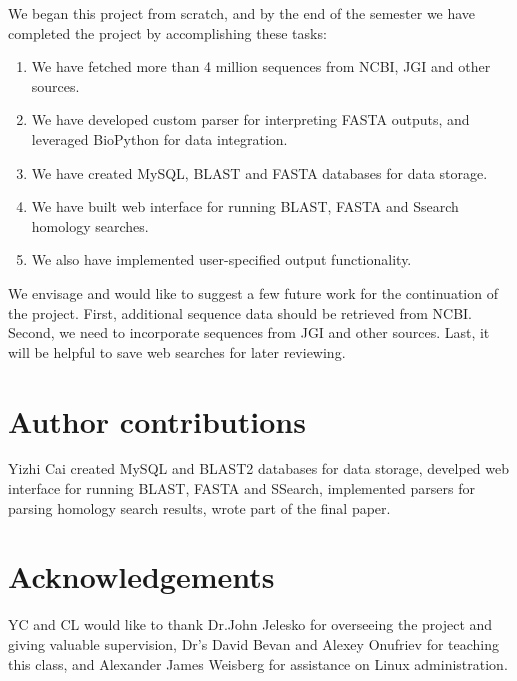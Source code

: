 \documentclass[11pt,letterpaper,twoside,english]{article}
\begin{document}
We began this project from scratch, and by the end of the semester
we have completed the project by accomplishing these tasks:
\begin{enumerate}
\item We have fetched more than 4 million sequences from NCBI, JGI and other
sources.
\item We have developed custom parser for interpreting FASTA outputs, and
leveraged BioPython for data integration.
\item We have created MySQL, BLAST and FASTA databases for data storage.
\item We have built web interface for running BLAST, FASTA and Ssearch homology
searches.
\item We also have implemented user-specified output functionality.
\end{enumerate}
We envisage and would like to suggest a few future work for the continuation
of the project. First, additional sequence data should be retrieved
from NCBI. Second, we need to incorporate sequences from JGI and other
sources. Last, it will be helpful to save web searches for later reviewing.


\section{Author contributions}

Yizhi Cai created MySQL and BLAST2 databases for data storage, develped
web interface for running BLAST, FASTA and SSearch, implemented parsers
for parsing homology search results, wrote part of the final paper.


\section{Acknowledgements}

YC and CL would like to thank Dr.John Jelesko for overseeing the project
and giving valuable supervision, Dr's David Bevan and Alexey Onufriev
for teaching this class, and Alexander James Weisberg for assistance
on Linux administration.



\end{document}
